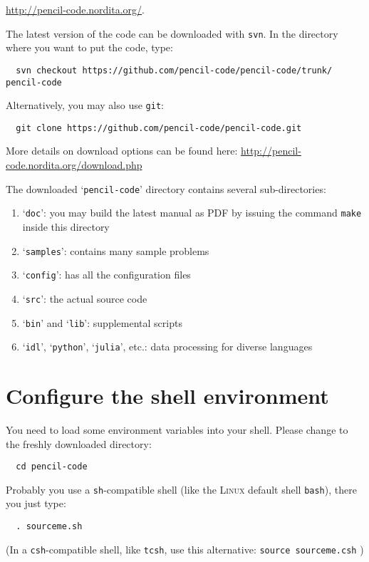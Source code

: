 \documentclass[a4paper,12pt]{article}
\newcommand{\command}[1]{\texttt{#1}}
\newcommand{\directory}[1]{`\texttt{#1}'}
\newcommand{\name}[1]{\textsc{#1}}
\begin{document}
\url{http://pencil-code.nordita.org/}.

The latest version of the code can be downloaded with \command{svn}. In the
directory where you want to put the code, type:
\begin{verbatim}
  svn checkout https://github.com/pencil-code/pencil-code/trunk/ pencil-code
\end{verbatim}

Alternatively, you may also use \command{git}:
\begin{verbatim}
  git clone https://github.com/pencil-code/pencil-code.git
\end{verbatim}

More details on download options can be found here: \url{http://pencil-code.nordita.org/download.php}

The downloaded \directory{pencil-code} directory contains several sub-directories:
\begin{enumerate}
  \item \directory{doc}: you may build the latest manual as PDF by issuing the command \command{make} inside this directory
  \item \directory{samples}: contains many sample problems
  \item \directory{config}: has all the configuration files
  \item \directory{src}: the actual source code
  \item \directory{bin} and \directory{lib}: supplemental scripts
  \item \directory{idl}, \directory{python}, \directory{julia}, etc.: data processing for diverse languages
\end{enumerate}


\section{Configure the shell environment}

You need to load some environment variables into your shell.
Please change to the freshly downloaded directory:
\begin{verbatim}
  cd pencil-code
\end{verbatim}

Probably you use a \command{sh}-compatible shell (like the \name{Linux} default shell \command{bash}), there you just type:
\begin{verbatim}
  . sourceme.sh
\end{verbatim}

(In a \command{csh}-compatible shell, like \command{tcsh}, use this alternative: \command{source sourceme.csh} )
\end{document}
